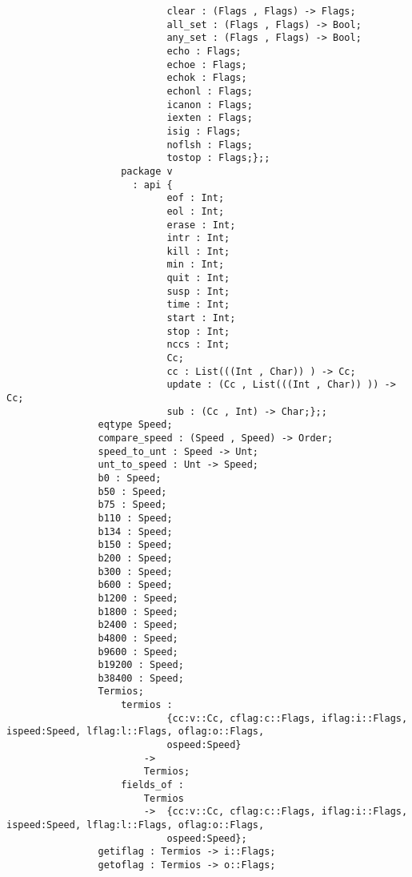 \begin{verbatim}
                            clear : (Flags , Flags) -> Flags;
                            all_set : (Flags , Flags) -> Bool;
                            any_set : (Flags , Flags) -> Bool;
                            echo : Flags;
                            echoe : Flags;
                            echok : Flags;
                            echonl : Flags;
                            icanon : Flags;
                            iexten : Flags;
                            isig : Flags;
                            noflsh : Flags;
                            tostop : Flags;};;
                    package v
                      : api {
                            eof : Int;
                            eol : Int;
                            erase : Int;
                            intr : Int;
                            kill : Int;
                            min : Int;
                            quit : Int;
                            susp : Int;
                            time : Int;
                            start : Int;
                            stop : Int;
                            nccs : Int;
                            Cc;
                            cc : List(((Int , Char)) ) -> Cc;
                            update : (Cc , List(((Int , Char)) )) -> Cc;
                            sub : (Cc , Int) -> Char;};;
                eqtype Speed;
                compare_speed : (Speed , Speed) -> Order;
                speed_to_unt : Speed -> Unt;
                unt_to_speed : Unt -> Speed;
                b0 : Speed;
                b50 : Speed;
                b75 : Speed;
                b110 : Speed;
                b134 : Speed;
                b150 : Speed;
                b200 : Speed;
                b300 : Speed;
                b600 : Speed;
                b1200 : Speed;
                b1800 : Speed;
                b2400 : Speed;
                b4800 : Speed;
                b9600 : Speed;
                b19200 : Speed;
                b38400 : Speed;
                Termios;
                    termios :
                            {cc:v::Cc, cflag:c::Flags, iflag:i::Flags, ispeed:Speed, lflag:l::Flags, oflag:o::Flags,
                            ospeed:Speed}
                        ->
                        Termios;
                    fields_of :
                        Termios
                        ->  {cc:v::Cc, cflag:c::Flags, iflag:i::Flags, ispeed:Speed, lflag:l::Flags, oflag:o::Flags,
                            ospeed:Speed};
                getiflag : Termios -> i::Flags;
                getoflag : Termios -> o::Flags;

\end{verbatim}
